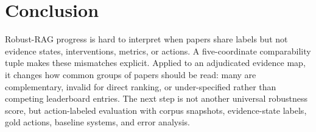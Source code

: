 \documentclass[11pt]{article}
\begin{document}
\section{Conclusion}

Robust-RAG progress is hard to interpret when papers share labels but not evidence states, interventions, metrics, or actions. A five-coordinate comparability tuple makes these mismatches explicit. Applied to an adjudicated evidence map, it changes how common groups of papers should be read: many are complementary, invalid for direct ranking, or under-specified rather than competing leaderboard entries. The next step is not another universal robustness score, but action-labeled evaluation with corpus snapshots, evidence-state labels, gold actions, baseline systems, and error analysis.

\clearpage


\appendix

\end{document}
